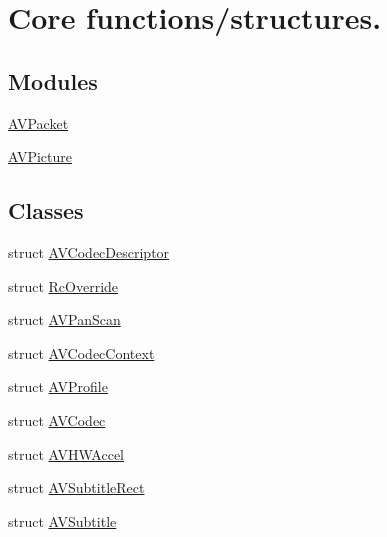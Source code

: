 \hypertarget{group__lavc__core}{}\section{Core functions/structures.}
\label{group__lavc__core}
\subsection*{Modules}
\begin{DoxyCompactItemize}
\item 
\hyperlink{group__lavc__packet}{A\+V\+Packet}
\item 
\hyperlink{group__lavc__picture}{A\+V\+Picture}
\end{DoxyCompactItemize}
\subsection*{Classes}
\begin{DoxyCompactItemize}
\item 
struct \hyperlink{struct_a_v_codec_descriptor}{A\+V\+Codec\+Descriptor}
\item 
struct \hyperlink{struct_rc_override}{Rc\+Override}
\item 
struct \hyperlink{struct_a_v_pan_scan}{A\+V\+Pan\+Scan}
\item 
struct \hyperlink{struct_a_v_codec_context}{A\+V\+Codec\+Context}
\item 
struct \hyperlink{struct_a_v_profile}{A\+V\+Profile}
\item 
struct \hyperlink{struct_a_v_codec}{A\+V\+Codec}
\item 
struct \hyperlink{struct_a_v_h_w_accel}{A\+V\+H\+W\+Accel}
\item 
struct \hyperlink{struct_a_v_subtitle_rect}{A\+V\+Subtitle\+Rect}
\item 
struct \hyperlink{struct_a_v_subtitle}{A\+V\+Subtitle}
\end{DoxyCompactItemize}

